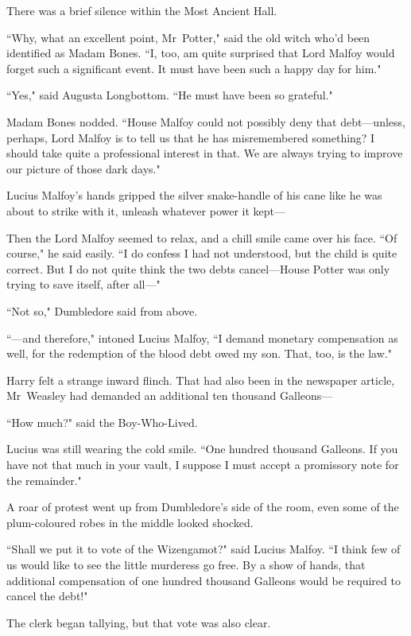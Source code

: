 There was a brief silence within the Most Ancient Hall.

``Why, what an excellent point, Mr~Potter," said the old witch who'd been identified as Madam Bones. ``I, too, am quite surprised that Lord Malfoy would forget such a significant event. It must have been such a happy day for him."

``Yes," said Augusta Longbottom. ``He must have been so grateful."

Madam Bones nodded. ``House Malfoy could not possibly deny that debt—unless, perhaps, Lord Malfoy is to tell us that he has misremembered something? I should take quite a professional interest in that. We are always trying to improve our picture of those dark days."

Lucius Malfoy's hands gripped the silver snake-handle of his cane like he was about to strike with it, unleash whatever power it kept—

Then the Lord Malfoy seemed to relax, and a chill smile came over his face. ``Of course," he said easily. ``I do confess I had not understood, but the child is quite correct. But I do not quite think the two debts cancel—House Potter was only trying to save itself, after all—"

``Not so," Dumbledore said from above.

``—and therefore," intoned Lucius Malfoy, ``I demand monetary compensation as well, for the redemption of the blood debt owed my son. That, too, is the law."

Harry felt a strange inward flinch. That had also been in the newspaper article, Mr~Weasley had demanded an additional ten thousand Galleons—

``How much?" said the Boy-Who-Lived.

Lucius was still wearing the cold smile. ``One hundred thousand Galleons. If you have not that much in your vault, I suppose I must accept a promissory note for the remainder."

A roar of protest went up from Dumbledore's side of the room, even some of the plum-coloured robes in the middle looked shocked.

``Shall we put it to vote of the Wizengamot?" said Lucius Malfoy. ``I think few of us would like to see the little murderess go free. By a show of hands, that additional compensation of one hundred thousand Galleons would be required to cancel the debt!"

The clerk began tallying, but that vote was also clear.

